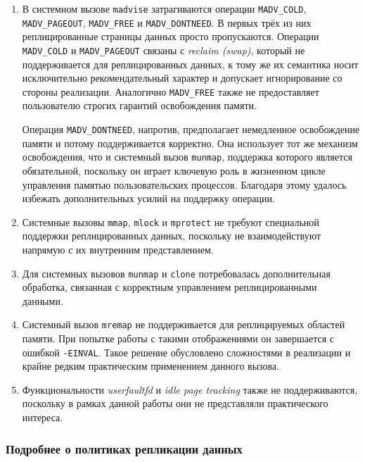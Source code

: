 \begin{enumerate}
    \item В системном вызове \texttt{madvise}\cite{madvise} затрагиваются операции \texttt{MADV\_COLD}, \texttt{MADV\_PAGEOUT}, \texttt{MADV\_FREE} и \texttt{MADV\_DONTNEED}. В первых трёх из них реплицированные страницы данных просто пропускаются. Операции \texttt{MADV\_COLD} и \texttt{MADV\_PAGEOUT} связаны с \textit{reclaim (swap)}, который не поддерживается для реплицированных данных, к тому же их семантика носит исключительно рекомендательный характер и допускает игнорирование со стороны реализации. Аналогично \texttt{MADV\_FREE} также не предоставляет пользователю строгих гарантий освобождения памяти.

    Операция \texttt{MADV\_DONTNEED}, напротив, предполагает немедленное освобождение памяти и потому поддерживается корректно. Она использует тот же механизм освобождения, что и системный вызов \texttt{munmap}, поддержка которого является обязательной, поскольку он играет ключевую роль в жизненном цикле управления памятью пользовательских процессов. Благодаря этому удалось избежать дополнительных усилий на поддержку операции.

    \item Системные вызовы \texttt{mmap}\cite{mmap}, \texttt{mlock}\cite{mlock} и \texttt{mprotect}\cite{mprotect} не требуют специальной поддержки реплицированных данных, поскольку не взаимодействуют напрямую с их внутренним представлением.

    \item Для системных вызовов \texttt{munmap}\cite{munmap} и \texttt{clone}\cite{clone} потребовалась дополнительная обработка, связанная с корректным управлением реплицированными данными.

    \item Системный вызов \texttt{mremap}\cite{mremap} не поддерживается для реплицируемых областей памяти. При попытке работы с такими отображениями он завершается с ошибкой \texttt{-EINVAL}. Такое решение обусловлено сложностями в реализации и крайне редким практическим применением данного вызова.

    \item Функциональности \textit{userfaultfd}\cite{userfaultfd} и \textit{idle page tracking}\cite{page_idle} также не поддерживаются, поскольку в рамках данной работы они не представляли практического интереса.
\end{enumerate}

\subsubsection{Подробнее о политиках репликации данных}
\label{sec:Chapter3_data_repl_policies}

